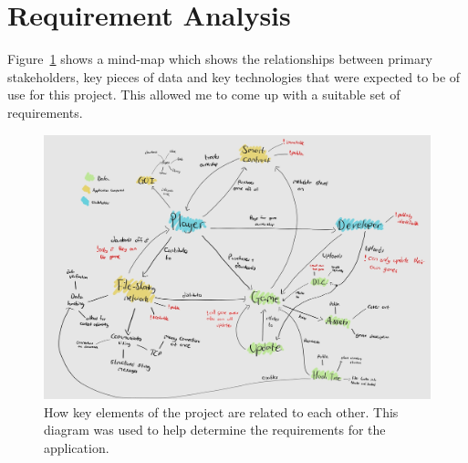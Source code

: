 \section*{Requirement Analysis}\label{app:req-analysis}

Figure~\ref{fig:req-generator} shows a mind-map which shows the relationships between primary stakeholders, key pieces of data and key technologies that were expected to be of use for this project. This allowed me to come up with a suitable set of requirements.

\begin{figure}[ht]
  \centering
  \includegraphics[width=.9\textwidth]{assets/images/diagrams/requirement-generation.jpg}
  \caption{How key elements of the project are related to each other. This diagram was used to help determine the requirements for the application.}
  \label{fig:req-generator}
\end{figure}
